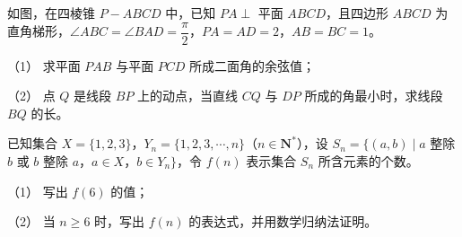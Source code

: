 \begin{question}
如图，在四棱锥 \(P-ABCD\) 中，已知 \(PA\perp\) 平面 \(ABCD\)，且四边形 \(ABCD\) 为直角梯形，\(\angle ABC=\angle BAD=\dfrac{\pi}{2}\)，\(PA=AD=2\)，\(AB=BC=1\)。

（1） 求平面 \(PAB\) 与平面 \(PCD\) 所成二面角的余弦值；

（2） 点 \(Q\) 是线段 \(BP\) 上的动点，当直线 \(CQ\) 与 \(DP\) 所成的角最小时，求线段 \(BQ\) 的长。
\nopagebreak[4]
\begin{center}\end{center}
\nopagebreak[4]
\end{question}
\begin{question}
已知集合 \(X=\{1,2,3\}\)，\(Y_{n}=\{1,2,3,\cdots,n\}\)（\(n\in\mathbf{N}^{*}\)），设 \(S_{n}=\{(a,b)\mid a\) 整除 \(b\) 或 \(b\) 整除 \(a\)，\(a\in X\)，\(b\in Y_{n}\}\)，令 \(f(n)\) 表示集合 \(S_{n}\) 所含元素的个数。

（1） 写出 \(f(6)\) 的值；

（2） 当 \(n\geqslant 6\) 时，写出 \(f(n)\) 的表达式，并用数学归纳法证明。

\end{question}